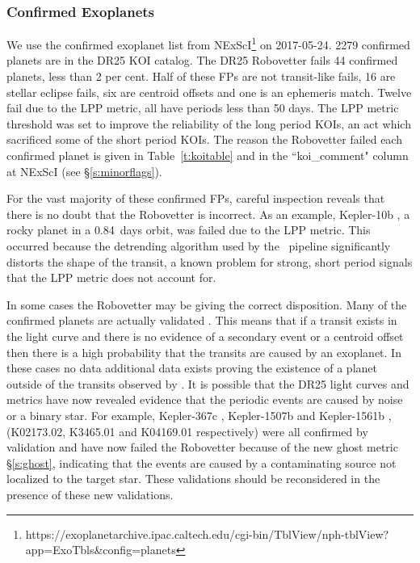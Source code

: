 \subsubsection{Confirmed Exoplanets}
We use the confirmed exoplanet list from NExScI\footnote{https://exoplanetarchive.ipac.caltech.edu/cgi-bin/TblView/nph-tblView?app=ExoTbls&config=planets} on 2017-05-24.  2279 confirmed planets are in the DR25 KOI catalog.  The DR25 Robovetter fails 44 confirmed planets, less than 2 per cent. Half of these FPs are not transit-like fails, 16 are stellar eclipse fails, six are centroid offsets and one is an ephemeris match. Twelve fail due to the LPP metric, all have periods less than 50 days.  The LPP metric threshold was set to improve the reliability of the long period KOIs, an act which sacrificed some of the short period KOIs.  The reason the Robovetter failed each confirmed planet is given in Table~\ref{t:koitable} and in the ``koi\_comment" column at NExScI (see \S\ref{s:minorflags}). 

For the vast majority of these confirmed FPs, careful inspection reveals that there is no doubt that the Robovetter is incorrect. As an example, Kepler-10b \citep[][]{Batalha2011Kepler10,Fogtmann2014Kepler10}, a rocky planet in a 0.84~days orbit, was failed due to the LPP metric. This occurred because the detrending algorithm used by the \Kepler\ pipeline significantly distorts the shape of the transit, a known problem for strong, short period signals that the LPP metric does not account for.

In some cases the Robovetter may be giving the correct disposition.  Many of the confirmed planets are actually validated \citep{Morton2016,Rowe2014}. This means that if a transit exists in the light curve and there is no evidence of a secondary event or a centroid offset then there is a high probability that the transits are caused by an exoplanet. In these cases no data additional data exists proving the existence of a planet outside of the transits observed by \Kepler. It is possible that the DR25 light curves and metrics have now revealed evidence that the periodic events are caused by noise or a binary star. For example, Kepler-367c \citep{Rowe2014}, Kepler-1507b \citep{Morton2016} and Kepler-1561b \citep{Morton2016}, (K02173.02, K3465.01 and K04169.01 respectively) were all confirmed by validation and have now failed the Robovetter because of the new ghost metric \S\ref{s:ghost}, indicating that the events are caused by a contaminating source not localized to the target star.  These validations should be reconsidered in the presence of these new validations.

